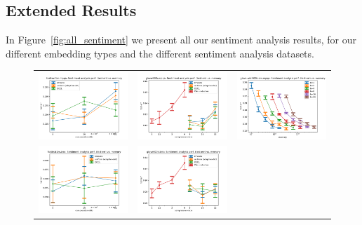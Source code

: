\subsection{Extended Results}
In Figure~\ref{fig:all_sentiment} we present all our sentiment analysis results, for our different embedding types and the different sentiment analysis datasets.
\begin{figure}
	\centering
	\begin{tabular} {c c c}
	\includegraphics[width=0.28\linewidth]{figures/fasttext1m_mpqa_test-err_vs_compression.pdf} &
	\includegraphics[width=0.28\linewidth]{figures/glove400k_mpqa_test-err_vs_compression.pdf} &
	\includegraphics[width=0.28\linewidth]{figures/glove-wiki400k-am_mpqa_test-err_vs_compression.pdf} \\[-0.5em]
	\includegraphics[width=0.28\linewidth]{figures/fasttext1m_trec_test-err_vs_compression.pdf} &
	\includegraphics[width=0.28\linewidth]{figures/glove400k_trec_test-err_vs_compression.pdf} &

\end{tabular}
\end{figure}
